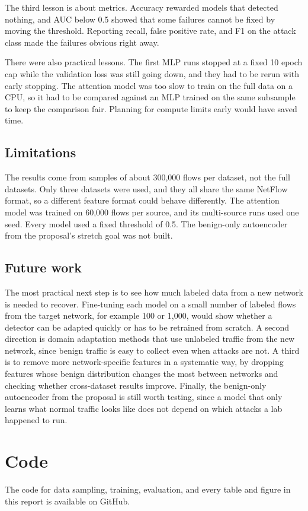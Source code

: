 \documentclass[10pt,twocolumn,letterpaper]{article}
\begin{document}
The third lesson is about metrics. Accuracy rewarded models that detected nothing, and AUC below 0.5 showed that some failures cannot be fixed by moving the threshold. Reporting recall, false positive rate, and F1 on the attack class made the failures obvious right away.

There were also practical lessons. The first MLP runs stopped at a fixed 10 epoch cap while the validation loss was still going down, and they had to be rerun with early stopping. The attention model was too slow to train on the full data on a CPU, so it had to be compared against an MLP trained on the same subsample to keep the comparison fair. Planning for compute limits early would have saved time.

\subsection{Limitations}

The results come from samples of about 300,000 flows per dataset, not the full datasets. Only three datasets were used, and they all share the same NetFlow format, so a different feature format could behave differently. The attention model was trained on 60,000 flows per source, and its multi-source runs used one seed. Every model used a fixed threshold of 0.5. The benign-only autoencoder from the proposal's stretch goal was not built.

\subsection{Future work}

The most practical next step is to see how much labeled data from a new network is needed to recover. Fine-tuning each model on a small number of labeled flows from the target network, for example 100 or 1,000, would show whether a detector can be adapted quickly or has to be retrained from scratch. A second direction is domain adaptation methods that use unlabeled traffic from the new network, since benign traffic is easy to collect even when attacks are not. A third is to remove more network-specific features in a systematic way, by dropping features whose benign distribution changes the most between networks and checking whether cross-dataset results improve. Finally, the benign-only autoencoder from the proposal is still worth testing, since a model that only learns what normal traffic looks like does not depend on which attacks a lab happened to run.

\section*{Code}
The code for data sampling, training, evaluation, and every table and figure in this report is available on GitHub.
\begin{center}\footnotesize\mbox{\GITHUB}\end{center}

{
\small


}
\end{document}
